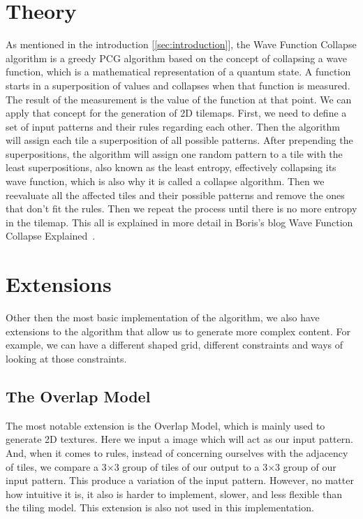 \documentclass[10pt,oneside,a4paper]{article}
\begin{document}
\section{Theory}\label{sec:theory}
As mentioned in the introduction [\ref*{sec:introduction}], the Wave Function Collapse algorithm is a greedy PCG algorithm based on the concept of collapsing a wave function, which is a mathematical representation of a quantum state.
A function starts in a superposition of values and collapses when that function is measured.
The result of the measurement is the value of the function at that point.
We can apply that concept for the generation of 2D tilemaps.
First, we need to define a set of input patterns and their rules regarding each other.
Then the algorithm will assign each tile a superposition of all possible patterns.
After prepending the superpositions, the algorithm will assign one random pattern to a tile with the least superpositions, also known as the least entropy, effectively collapsing its wave function, which is also why it is called a collapse algorithm.
Then we reevaluate all the affected tiles and their possible patterns and remove the ones that don't fit the rules.
Then we repeat the process until there is no more entropy in the tilemap.
This all is explained in more detail in Boris's blog Wave Function Collapse Explained~\cite{WFCE}.

\section{Extensions}\label{sec:extensions}
Other then the most basic implementation of the algorithm, we also have extensions to the algorithm that allow us to generate more complex content.
For example, we can have a different shaped grid, different constraints and ways of looking at those constraints.

\subsection{The Overlap Model}
The most notable extension is the Overlap Model, which is mainly used to generate 2D textures.
Here we input a image which will act as our input pattern.
And, when it comes to rules, instead of concerning ourselves with the adjacency of tiles, we compare a 3$\times$3 group of tiles of our output to a 3$\times$3 group of our input pattern.
This produce a variation of the input pattern.
However, no matter how intuitive it is, it also is harder to implement, slower, and less flexible than the tiling model.
This extension is also not used in this implementation.
\end{document}
